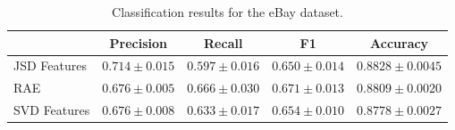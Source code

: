 \documentclass{article} %
\begin{document}

\begin{table}[t]
\caption{Classification results for the eBay dataset.}
\label{tab:classification-results}
\vspace{-4mm}
\begin{center}
\begin{tabular}{|l|c|c|c|c|}
\hline
&Precision & Recall & F1 & Accuracy
\\ \hline 
JSD Features         &$\mathbf{0.714}\pm 0.015$&$0.597\pm 0.016$&$0.650\pm
0.014$& $\mathbf{0.8828}\pm 0.0045$\\
RAE             &$0.676\pm 0.005$&$\mathbf{0.666}\pm 0.030$&$\mathbf{0.671}\pm
0.013$&$0.8809\pm 0.0020$ \\
SVD Features             &$0.676\pm 0.008$&$0.633\pm 0.017$&$0.654\pm
0.010$&$0.8778\pm 0.0027$\\
\hline
\end{tabular}
\end{center}
\end{table}
\end{document}
